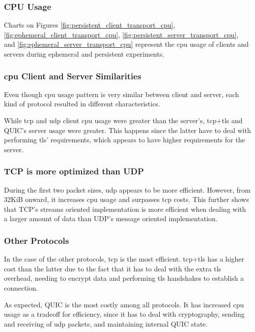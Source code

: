 \subsubsection{CPU Usage}

Charts on Figures \ref{fig:persistent_client_transport_cpu}, \ref{fig:ephemeral_client_transport_cpu}, \ref{fig:persistent_server_transport_cpu}, and \ref{fig:ephemeral_server_transport_cpu} represent the \gls{cpu} usage of clients and servers during ephemeral and persistent experiments.

\subsubsection*{\gls{cpu} Client and Server Similarities}

Even though \gls{cpu} usage pattern is very similar between client and server, each kind of protocol resulted in different characteristics.

While \gls{tcp} and \gls{udp} client \gls{cpu} usage were greater than the server's, \gls{tcp}+\gls{tls} and QUIC’s server usage were greater. This happens since the latter have to deal with performing \gls{tls}’ requirements, which appears to have higher requirements for the server.

\subsubsection*{TCP is more optimized than UDP}

During the first two packet sizes, \gls{udp} appears to be more efficient. However, from 32KiB onward, it increases \gls{cpu} usage and surpasses \gls{tcp} costs. This further shows that TCP’s streams oriented implementation is more efficient when dealing with a larger amount of data than UDP’s message oriented implementation.

\subsubsection*{Other Protocols}

In the case of the other protocols, \gls{tcp} is the most efficient. \gls{tcp}+\gls{tls} has a higher cost than the latter due to the fact that it has to deal with the extra \gls{tls} overhead, needing to encrypt data and performing \gls{tls} handshakes to establish a connection.

As expected, QUIC is the most costly among all protocols. It has increased \gls{cpu} usage as a tradeoff for efficiency, since it has to deal with cryptography, sending and receiving of \gls{udp} packets, and maintaining internal QUIC state.

